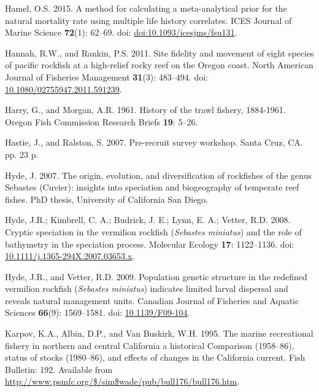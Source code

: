 \documentclass[
  english,
  a4paper,
]{article}
\newlength{\cslhangindent}
\newlength{\cslentryspacingunit} %
\newenvironment{CSLReferences}[2] %
 {%
  \setlength{\parindent}{0pt}
  \ifodd #1
  \let\oldpar\par
  \def\par{\hangindent=\cslhangindent\oldpar}
  \fi
  \setlength{\parskip}{#2\cslentryspacingunit}
 }%
 {}
\begin{document}
\begin{CSLReferences}{1}{0}
\leavevmode{}%
Hamel, O.S. 2015. {A method for calculating a meta-analytical prior for the natural mortality rate using multiple life history correlates}. ICES Journal of Marine Science \textbf{72}(1): 62--69. doi: \href{https://doi.org/doi:10.1093/icesjms/fsu131}{doi:10.1093/icesjms/fsu131}.

\leavevmode{}%
Hannah, R.W., and Rankin, P.S. 2011. {Site fidelity and movement of eight species of pacific rockfish at a high-relief rocky reef on the Oregon coast}. North American Journal of Fisheries Management \textbf{31}(3): 483--494. doi: \href{https://doi.org/10.1080/02755947.2011.591239}{10.1080/02755947.2011.591239}.

\leavevmode{}%
Harry, G., and Morgan, A.R. 1961. {History of the trawl fishery, 1884-1961}. Oregon Fish Commission Research Briefs \textbf{19}: 5--26.

\leavevmode{}%
Hastie, J., and Ralston, S. 2007. {Pre-recruit survey workshop}. Santa Cruz, CA. pp. 23 p.

\leavevmode{}%
Hyde, J. 2007. {The origin, evolution, and diversification of rockfishes of the genus Sebastes (Cuvier): insights into speciation and biogeography of temperate reef fishes}. PhD thesis, University of California San Diego.

\leavevmode{}%
Hyde, J.R.; Kimbrell, C. A.; Budrick, J. E.; Lynn, E. A.; Vetter, R.D. 2008. {Cryptic speciation in the vermilion rockfish (\emph{Sebastes miniatus}) and the role of bathymetry in the speciation process}. Molecular Ecology \textbf{17}: 1122--1136. doi: \href{https://doi.org/10.1111/j.1365-294X.2007.03653.x}{10.1111/j.1365-294X.2007.03653.x}.

\leavevmode{}%
Hyde, J.R., and Vetter, R.D. 2009. {Population genetic structure in the redefined vermilion rockfish (\emph{Sebastes miniatus}) indicates limited larval dispersal and reveals natural management units}. Canadian Journal of Fisheries and Aquatic Sciences \textbf{66}(9): 1569--1581. doi: \href{https://doi.org/10.1139/F09-104}{10.1139/F09-104}.

\leavevmode{}%
Karpov, K.A., Albin, D.P., and Van Buskirk, W.H. 1995. {The marine recreational fishery in northern and central California a historical Comparison (1958--86), status of stocks (1980--86), and effects of changes in the California current}. Fish Bulletin: 192. Available from \url{http://www.psmfc.org/$/sim$wade/pub/bull176/bull176.htm}.


\end{CSLReferences}
\end{document}
